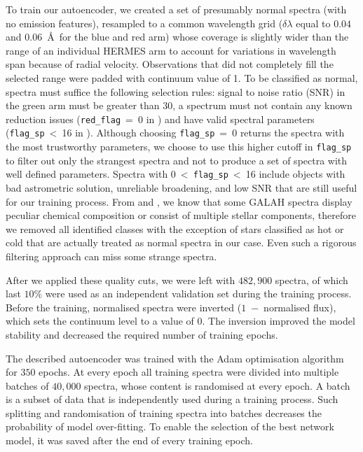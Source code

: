 To train our autoencoder, we created a set of presumably normal spectra (with no emission features), resampled to a common wavelength grid ($\delta \lambda$ equal to $0.04$ and $0.06$~\AA\ for the blue and red arm) whose coverage is slightly wider than the range of an individual HERMES arm to account for variations in wavelength span because of radial velocity. Observations that did not completely fill the selected range were padded with continuum value of 1. To be classified as normal, spectra must suffice the following selection rules: signal to noise ratio (SNR) in the green arm must be greater than $30$, a spectrum must not contain any known reduction issues (\texttt{red\_flag}~=~0 in \citet{2017MNRAS.464.1259K}) and have valid spectral parameters (\texttt{flag\_sp}~<~16 in \citet{buder2020}). Although choosing \texttt{flag\_sp}~=~0 returns the spectra with the most trustworthy parameters, we choose to use this higher cutoff in \texttt{flag\_sp} to filter out only the strangest spectra and not to produce a set of spectra with well defined parameters. Spectra with 0~<~\texttt{flag\_sp}~<~16 include objects with bad astrometric solution, unreliable broadening, and low SNR that are still useful for our training process. From \citet{2017ApJS..228...24T, 2018MNRAS.478.4513B} and \citet{2019MNRAS.483.3196C}, we know that some GALAH spectra display peculiar chemical composition or consist of multiple stellar components, therefore we removed all identified classes with the exception of stars classified as hot or cold that are actually treated as normal spectra in our case. Even such a rigorous filtering approach can miss some strange spectra.

After we applied these quality cuts, we were left with $482,900$ spectra, of which last $10\%$ were used as an independent validation set during the training process. Before the training, normalised spectra were inverted ($1$~$-$~normalised flux), which sets the continuum level to a value of $0$. The inversion improved the model stability and decreased the required number of training epochs.

The described autoencoder was trained with the Adam optimisation algorithm \cite{2014arXiv1412.6980K} for $350$ epochs. At every epoch all training spectra were divided into multiple batches of $40,000$ spectra, whose content is randomised at every epoch. A batch is a subset of data that is independently used during a training process. Such splitting and randomisation of training spectra into batches decreases the probability of model over-fitting. To enable the selection of the best network model, it was saved after the end of every training epoch. 

